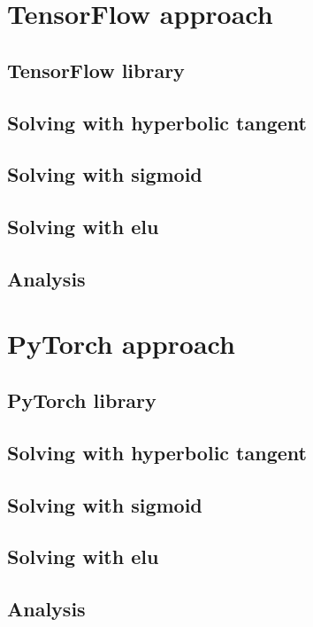 \section{TensorFlow approach}
\subsection{TensorFlow library}
\subsection{Solving with hyperbolic tangent}



\subsection{Solving with sigmoid}



\subsection{Solving with elu}


\subsection{Analysis}


\section{PyTorch approach}
\subsection{PyTorch library}



\subsection{Solving with hyperbolic tangent}



\subsection{Solving with sigmoid}



\subsection{Solving with elu}




\subsection{Analysis}
